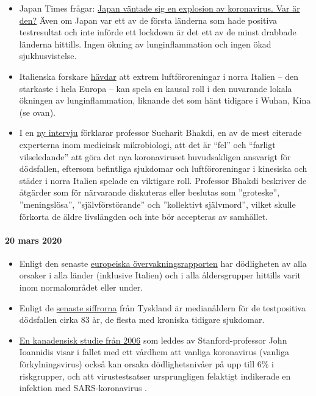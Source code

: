 \begin{itemize}
\tightlist
\item
  Japan Times frågar:
  \href{https://www.japantimes.co.jp/news/2020/03/20/national/coronavirus-explosion-expected-japan/}{Japan
  väntade sig en explosion av koronavirus. Var är den?} Även om Japan
  var ett av de första länderna som hade positiva testresultat och inte
  införde ett lockdown är det ett av de minst drabbade länderna
  hittills. Ingen ökning av lunginflammation och ingen ökad
  sjukhusvistelse.
\item
  Italienska forskare
  \href{https://www.heise.de/tp/features/Feinstaubpartikel-als-Viren-Vehikel-4687454.html}{hävdar}
  att extrem luftföroreningar i norra Italien -- den starkaste i hela
  Europa -- kan spela en kausal roll i den nuvarande lokala ökningen av
  lunginflammation, liknande det som hänt tidigare i Wuhan, Kina (se
  ovan).
\item
  I en \href{https://www.youtube.com/watch?v=JBB9bA-gXL4}{ny intervju}
  förklarar professor Sucharit Bhakdi, en av de mest citerade experterna
  inom medicinsk mikrobiologi, att det är ``fel'' och ``farligt
  vilseledande'' att göra det nya koronaviruset huvudsakligen ansvarigt
  för dödsfallen, eftersom befintliga sjukdomar och luftföroreningar i
  kinesiska och städer i norra Italien spelade en viktigare roll.
  Professor Bhakdi beskriver de åtgärder som för närvarande diskuteras
  eller beslutas som ''groteske'', ''meningslösa'', ''självförstörande''
  och ''kollektivt självmord'', vilket skulle förkorta de äldre
  livslängden och inte bör accepteras av samhället.
\end{itemize}

\hypertarget{20-mars-2020}{%
\paragraph{20 mars 2020}\label{20-mars-2020}}

\begin{itemize}
\tightlist
\item
  Enligt den senaste
  \href{https://www.euromomo.eu/index.html}{europeiska
  övervakningsrapporten} har dödligheten av alla orsaker i alla länder
  (inklusive Italien) och i alla åldersgrupper hittills varit inom
  normalområdet eller under.
\item
  Enligt de
  \href{https://de.wikipedia.org/wiki/COVID-19-Pandemie_in_Deutschland\#Todesf\%C3\%A4lle_in_den_Medien}{senaste
  siffrorna} från Tyskland är medianåldern för de testpositiva
  dödsfallen cirka 83 år, de flesta med kroniska tidigare sjukdomar.
\item
  \href{https://www.ncbi.nlm.nih.gov/pmc/articles/PMC2095096/}{En
  kanadensisk studie från 2006} som leddes av Stanford-professor John
  Ioannidis visar i fallet med ett vårdhem att vanliga koronavirus
  (vanliga förkylningsvirus) också kan orsaka dödlighetsnivåer på upp
  till 6\% i riskgrupper, och att virustestsatser ursprungligen
  felaktigt indikerade en infektion med SARS-koronavirus .
\end{itemize}

